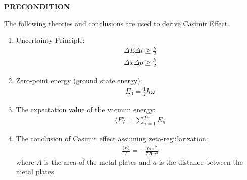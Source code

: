 \noindent\textbf{PRECONDITION}


The following theories and conclusions are used to derive Casimir Effect.
\begin{enumerate}
    \item Uncertainty Principle\citep*{heisenberg1930physical}:
        \begin{align}
            &\Delta E \Delta t \ge \frac{\hbar}{2}\\
            &\Delta x \Delta p \ge \frac{\hbar}{2}
        \end{align}
    \item Zero-point energy (ground state energy): \begin{align}&E_0 = \frac{1}{2}\hbar\omega\end{align}
    \item The expectation value of the vacuum energy: \begin{align}&\langle E \rangle = \sum_{n=1}^{\infty} E_n\end{align}
    \item The conclusion of Casimir effect\citep*{Casimir:1948dh} assuming zeta-regularization\citep*{enwiki:1212199656}: 
    \begin{align}&\frac{\langle E \rangle}{A} = -\frac{\hbar c \pi^2}{720 a^3}\end{align}
    where \(A\) is the area of the metal plates and $a$ is the distance between the metal plates.
\end{enumerate}
